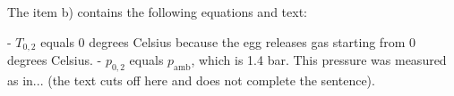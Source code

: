 The item b) contains the following equations and text:

- \( T_{0,2} \) equals 0 degrees Celsius because the egg releases gas starting from 0 degrees Celsius.
- \( p_{0,2} \) equals \( p_{\text{amb}} \), which is 1.4 bar. This pressure was measured as in... (the text cuts off here and does not complete the sentence).